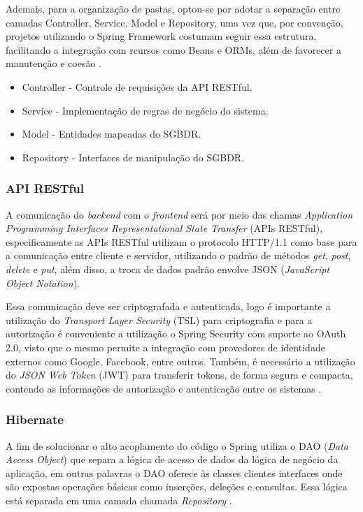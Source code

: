 Ademais, para a organização de pastas, optou-se por adotar a separação entre camadas Controller, Service, Model e Repository, uma vez que, por convenção, projetos utilizando o Spring Framework costumam seguir essa estrutura, facilitando a integração com rcursos como Beans e ORMs, além de favorecer a manutenção e coesão \cite{weissmann2014vire}.

\begin{itemize}
    \item Controller - Controle de requisições da API RESTful.
    \item Service - Implementação de regras de negócio do sistema.
    \item Model - Entidades mapeadas do SGBDR.
    \item Repository - Interfaces de manipulação do SGBDR.
\end{itemize}

\subsubsection{API RESTful}

A comunicação do \textit{backend} com o \textit{frontend} será por meio das chamas \textit{Application Programming Interfaces Representational State Transfer} (APIs RESTful), especificamente as APIs RESTful utilizam o protocolo HTTP/1.1 como base para a comunicação entre cliente e servidor, utilizando o padrão de métodos \textit{get}, \textit{post}, \textit{delete} e \textit{put}, além disso, a troca de dados padrão envolve JSON (\textit{JavaScript Object Notation}).

Essa comunicação deve ser criptografada e autenticada, logo é importante a utilização do \textit{Transport Layer Security} (TSL) para criptografia e para a autorização é conveniente a utilização o Spring Security com suporte ao OAuth 2.0, visto que o mesmo permite a integração com provedores de identidade externos como Google, Facebook, entre outros. Também, é necessário a utilização do \textit{JSON Web Token} (JWT) para transferir tokens, de forma segura e compacta, contendo as informações de autorização e autenticação entre os sistemas \cite{nascimento_2017}. 

\subsubsection{Hibernate}

A fim de solucionar o alto acoplamento do código o Spring utiliza o DAO (\textit{Data Access Object}) que separa a lógica de acesso de dados da lógica de negócio da aplicação, em outras palavras o DAO oferece às classes clientes interfaces onde são expostas operações básicas como inserções, deleções e consultas. Essa lógica está separada em uma camada chamada \textit{Repository} \cite{weissmann2014vire}.

